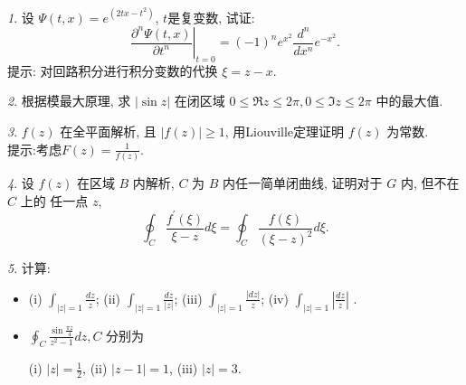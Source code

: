 \documentclass[11pt]{article}
\theoremstyle{remark}
\newtheorem{problem}{}
\begin{document}
\renewcommand{\labelenumi}{(\arabic{enumi})}
\renewcommand{\labelenumii}{(\arabic{enumi}.\arabic{enumii})}



 

\begin{problem}
  设 $\Psi(t, x)=e^{ \left(2 t x-t^2\right)}$, $t$是复变数, 试证: 
  $$
  \left.\frac{\partial^n \Psi(t, x)}{\partial t^n}\right|_{t=0}=(-1)^n e^{x^2} \frac{d^n}{d x^n} e^{-x^2}.
  $$
  提示: 对回路积分进行积分变数的代换 $\xi=z-x$.
\end{problem}

\begin{problem}
  根据模最大原理,
  求 $|\sin z|$ 在闭区域 $0 \leq \Re z \leq 2 \pi, 0 \leq \Im z \leq 2 \pi$ 中的最大值.
\end{problem}

\begin{problem}
  $f(z)$ 在全平面解析, 且 $|f(z)| \geq 1$, 用Liouville定理证明 $f(z)$ 为常数.
  \\
  提示:考虑$F(z) = \frac{1}{f(z)}$.
\end{problem}

\begin{problem}
  设 $f(z)$ 在区域 $B$ 内解析, $C$ 为 $B$ 内任一简单闭曲线, 证明对于 $G$ 内, 
  但不在 $C$ 上的 任一点 $z$, 
  $$
  \oint_C \frac{f^{\prime}(\xi)}{\xi-z} d \xi=\oint_C \frac{f(\xi)}{(\xi-z)^2} d \xi.
  $$ 
\end{problem}

\begin{problem}
  计算:
  \begin{itemize}
    \item 
    (i) $\int_{|z|=1} \frac{d z}{z}$;
    (ii) $\int_{|z|=1} \frac{d z}{|z|}$;
    (iii) $\int_{|z|=1} \frac{|d z|}{z}$;
    (iv) $\int_{|z|=1}\left|\frac{d z}{z}\right|$ .

    \item  $\oint_C \frac{\sin \frac{\pi z}{4}}{z^2-1} d z, C$ 分别为

    (i) $|z|=\frac{1}{2}$,
    (ii) $|z-1|=1$,
    (iii) $|z|=3$.
    
  \end{itemize}
\end{problem}
\end{document}
